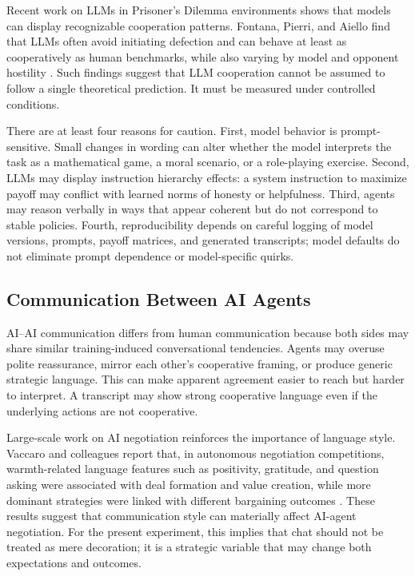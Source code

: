 \documentclass[12pt,a4paper]{article}
\begin{document}
Recent work on LLMs in Prisoner's Dilemma environments shows that models can display recognizable cooperation patterns. Fontana, Pierri, and Aiello find that LLMs often avoid initiating defection and can behave at least as cooperatively as human benchmarks, while also varying by model and opponent hostility \cite{fontana2024nicer}. Such findings suggest that LLM cooperation cannot be assumed to follow a single theoretical prediction. It must be measured under controlled conditions.

There are at least four reasons for caution. First, model behavior is prompt-sensitive. Small changes in wording can alter whether the model interprets the task as a mathematical game, a moral scenario, or a role-playing exercise. Second, LLMs may display instruction hierarchy effects: a system instruction to maximize payoff may conflict with learned norms of honesty or helpfulness. Third, agents may reason verbally in ways that appear coherent but do not correspond to stable policies. Fourth, reproducibility depends on careful logging of model versions, prompts, payoff matrices, and generated transcripts; model defaults do not eliminate prompt dependence or model-specific quirks.

\subsection{Communication Between AI Agents}

AI--AI communication differs from human communication because both sides may share similar training-induced conversational tendencies. Agents may overuse polite reassurance, mirror each other's cooperative framing, or produce generic strategic language. This can make apparent agreement easier to reach but harder to interpret. A transcript may show strong cooperative language even if the underlying actions are not cooperative.

Large-scale work on AI negotiation reinforces the importance of language style. Vaccaro and colleagues report that, in autonomous negotiation competitions, warmth-related language features such as positivity, gratitude, and question asking were associated with deal formation and value creation, while more dominant strategies were linked with different bargaining outcomes \cite{vaccaro2026advancing}. These results suggest that communication style can materially affect AI-agent negotiation. For the present experiment, this implies that chat should not be treated as mere decoration; it is a strategic variable that may change both expectations and outcomes.
\end{document}
